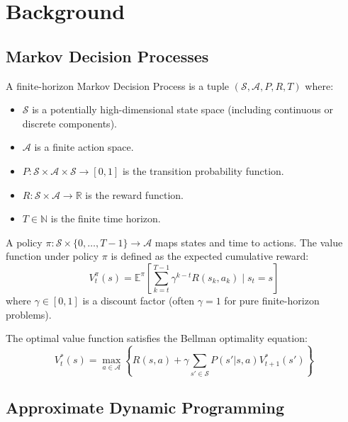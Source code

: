 \chapter{Background}
\label{chap:background}

\section{Markov Decision Processes}

\begin{definition}
	A finite-horizon Markov Decision Process is a tuple $(\mathcal{S}, \mathcal{A}, P, R, T)$ where:
	\begin{itemize}
		\item $\mathcal{S}$ is a potentially high-dimensional state space (including continuous or discrete components).
		\item $\mathcal{A}$ is a finite action space.
		\item $P: \mathcal{S} \times \mathcal{A} \times \mathcal{S} \to [0,1]$ is the transition probability function.
		\item $R: \mathcal{S} \times \mathcal{A} \to \mathbb{R}$ is the reward function.
		\item $T \in \mathbb{N}$ is the finite time horizon.
	\end{itemize}
\end{definition}

A policy $\pi: \mathcal{S} \times \{0, \ldots, T-1\} \to \mathcal{A}$ maps states and time to actions.
The value function under policy $\pi$ is defined as the expected cumulative reward:
%
\begin{equation}
	V^\pi_t(s) = \mathbb{E}^\pi\left[\sum_{k=t}^{T-1} \gamma^{k-t} R(s_k, a_k) \mid s_t = s\right]
\end{equation}
%
where $\gamma \in [0, 1]$ is a discount factor (often $\gamma=1$ for pure finite-horizon problems).

The optimal value function satisfies the Bellman optimality equation:
%
\begin{equation}
	V^*_t(s) = \max_{a \in \mathcal{A}} \left\{ R(s,a) + \gamma \sum_{s' \in \mathcal{S}} P(s'|s,a) V^*_{t+1}(s') \right\}
\end{equation}

\section{Approximate Dynamic Programming}

